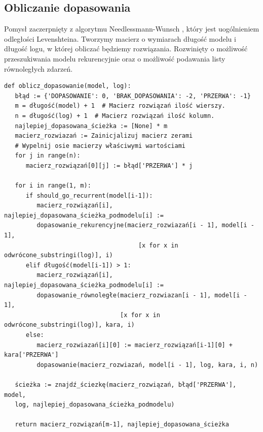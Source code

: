 \subsection{Obliczanie dopasowania}
Pomysł zaczerpnięty z algorytmu Needlessmann-Wunsch \cite{ea252fd3937a4a309a5e07e61e5531a7}, który jest uogólnieniem odległości Levenshteina. Tworzymy macierz o wymiarach długość modelu i długość logu, w której obliczać będziemy rozwiązania. Rozwinięty o możliwość przeszukiwania modelu rekurencyjnie oraz o możliwość podawania listy równoległych zdarzeń. 
\lstset{caption=Obliczanie dopasowania, captionpos=b}
\lstset{label=src:alignment_calculation, frame=single}
\begin{lstlisting}[escapeinside=``]
def oblicz_dopasowanie(model, log):
   błąd := {'DOPASOWANIE': 0, 'BRAK_DOPASOWANIA': -2, 'PRZERWA': -1}
   m = długość(model) + 1  # Macierz rozwiązań ilość wierszy.
   n = długość(log) + 1  # Macierz rozwiązań ilość kolumn.
   najlepiej_dopasowana_ścieżka := [None] * m
   macierz_rozwiazań := Zainicjalizuj macierz zerami
   # Wypelnij osie macierzy właściwymi wartościami
   for j in range(n):
      macierz_rozwiązań[0][j] := błąd['PRZERWA'] * j

   for i in range(1, m):
      if should_go_recurrent(model[i-1]):
         macierz_rozwiązań[i], najlepiej_dopasowana_ścieżka_podmodelu[i] := 
         dopasowanie_rekurencyjne(macierz_rozwiazań[i - 1], model[i - 1],
                                     [x for x in odwrócone_substringi(log)], i)
      elif długość(model[i-1]) > 1:
         macierz_rozwiązań[i], najlepiej_dopasowana_ścieżka_podmodelu[i] := 
         dopasowanie_równoległe(macierz_rozwiazan[i - 1], model[i - 1],
                                [x for x in odwrócone_substringi(log)], kara, i)
      else:
         macierz_rozwiazań[i][0] := macierz_rozwiązań[i-1][0] + kara['PRZERWA']
         dopasowanie(macierz_rozwiazań, model[i - 1], log, kara, i, n)

   ścieżka := znajdź_ściezkę(macierz_rozwiązań, błąd['PRZERWA'], model, 
   log, najlepiej_dopasowana_ścieżka_podmodelu)

   return macierz_rozwiązań[m-1], najlepiej_dopasowana_ścieżka
\end{lstlisting}

